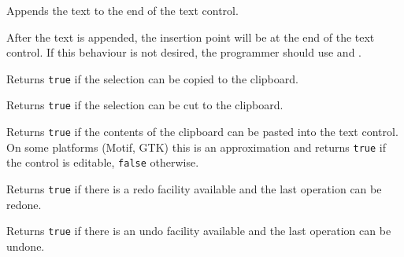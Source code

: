 
Appends the text to the end of the text control.




After the text is appended, the insertion point will be at the end of the text control. If this behaviour is not desired,
the programmer should use  and .




\label{wxtextctrlcancopy}


Returns {\tt true} if the selection can be copied to the clipboard.


\label{wxtextctrlcancut}


Returns {\tt true} if the selection can be cut to the clipboard.


\label{wxtextctrlcanpaste}


Returns {\tt true} if the contents of the clipboard can be pasted into the
text control. On some platforms (Motif, GTK) this is an approximation
and returns {\tt true} if the control is editable, {\tt false} otherwise.


\label{wxtextctrlcanredo}


Returns {\tt true} if there is a redo facility available and the last operation
can be redone.


\label{wxtextctrlcanundo}


Returns {\tt true} if there is an undo facility available and the last operation
can be undone.


\label{wxtextctrlclear}

